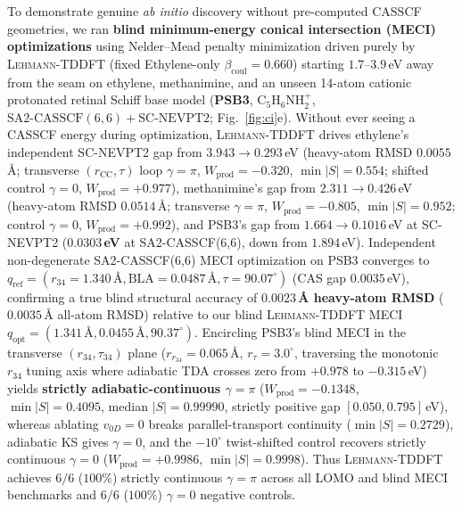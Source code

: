 \documentclass[10pt,twocolumn]{article}
\theoremstyle{natthm}
\newcommand{\leh}{\textsc{Lehmann-TDDFT}}
\begin{document}
To demonstrate genuine \emph{ab initio} discovery without pre-computed CASSCF geometries, we ran \textbf{blind minimum-energy conical intersection (MECI) optimizations} using Nelder--Mead penalty minimization\cite{levine2007} driven purely by \leh{} (fixed Ethylene-only $\beta_{\mathrm{coul}}=0.660$) starting $1.7$--$3.9$\,eV away from the seam on ethylene, methanimine, and an unseen 14-atom cationic protonated retinal Schiff base model (\textbf{PSB3}, $\mathrm{C}_5\mathrm{H}_6\mathrm{NH}_2^+$, $\mathrm{SA2\text{-}CASSCF}(6,6)\!+\!\mathrm{SC\text{-}NEVPT2}$; Fig.~\ref{fig:ci}e).
Without ever seeing a CASSCF energy during optimization, \leh{} drives ethylene's independent SC-NEVPT2 gap from $3.943\to 0.293$\,eV (heavy-atom RMSD $0.0055$\,\AA; transverse $(r_{\mathrm{CC}},\tau)$ loop $\gamma=\pi$, $W_{\mathrm{prod}}=-0.320$, $\min|S|=0.554$; shifted control $\gamma=0$, $W_{\mathrm{prod}}=+0.977$), methanimine's gap from $2.311\to 0.426$\,eV (heavy-atom RMSD $0.0514$\,\AA; transverse $\gamma=\pi$, $W_{\mathrm{prod}}=-0.805$, $\min|S|=0.952$; control $\gamma=0$, $W_{\mathrm{prod}}=+0.992$), and PSB3's gap from $1.664\to \mathbf{0.1016}$\,eV at SC-NEVPT2 (\textbf{$0.0303$\,eV} at SA2-CASSCF(6,6), down from $1.894$\,eV).
Independent non-degenerate SA2-CASSCF(6,6) MECI optimization on PSB3 converges to $q_{\mathrm{ref}}=(r_{34}=1.340\,\text{\AA}, \mathrm{BLA}=0.0487\,\text{\AA}, \tau=90.07^\circ)$ (CAS gap $0.0035$\,eV), confirming a true blind structural accuracy of \textbf{$0.0023$\,\AA{} heavy-atom RMSD} ($0.0035$\,\AA{} all-atom RMSD) relative to our blind \leh{} MECI $q_{\mathrm{opt}}=(1.341\,\text{\AA}, 0.0455\,\text{\AA}, 90.37^\circ)$.
Encircling PSB3's blind MECI in the transverse $(r_{34},\tau_{34})$ plane ($r_{r_{34}}=0.065$\,\AA, $r_\tau=3.0^\circ$, traversing the monotonic $r_{34}$ tuning axis where adiabatic TDA crosses zero from $+0.978$ to $-0.315$\,eV) yields \textbf{strictly adiabatic-continuous $\gamma=\pi$} ($W_{\mathrm{prod}}=-0.1348$, $\min|S|=0.4095$, median $|S|=0.99990$, strictly positive gap $[0.050,0.795]$\,eV), whereas ablating $v_{0D}=0$ breaks parallel-transport continuity ($\min|S|=0.2729$), adiabatic KS gives $\gamma=0$, and the $-10^\circ$ twist-shifted control recovers strictly continuous $\gamma=0$ ($W_{\mathrm{prod}}=+0.9986$, $\min|S|=0.9998$). Thus \leh{} achieves $6/6$ ($100\%$) strictly continuous $\gamma=\pi$ across all LOMO and blind MECI benchmarks and $6/6$ ($100\%$) $\gamma=0$ negative controls.
\end{document}
